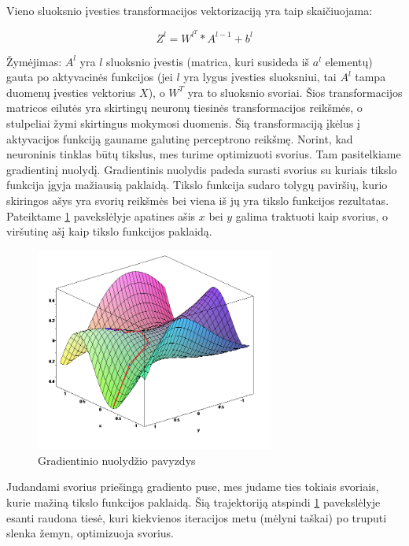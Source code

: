 \documentclass[a4paper, 12pt]{article}
\begin{document}
Vieno sluoksnio įvesties transformacijos vektorizaciją yra taip skaičiuojama:

$$
Z^{l}=W^{{l}^T} * A^{l-1}+b^{l}
$$

Žymėjimas: $A^l$ yra $l$ sluoksnio įvestis (matrica, kuri susideda iš $a^l$ elementų) gauta po aktyvacinės funkcijos (jei $l$ yra lygus įvesties sluoksniui, tai $A^l$ tampa duomenų įvesties vektorius $X$), o $W^T$ yra to sluoksnio svoriai.
Šios transformacijos matricos eilutės yra skirtingų neuronų tiesinės transformacijos reikšmės, o stulpeliai žymi skirtingus mokymosi duomenis. Šią transformaciją įkėlus į aktyvacijos funkciją gauname galutinę perceptrono reikšmę.
Norint, kad neuroninis tinklas būtų tikslus, mes turime optimizuoti svorius. Tam pasitelkiame gradientinį nuolydį. Gradientinis nuolydis padeda surasti svorius su kuriais tikslo funkcija įgyja mažiausią paklaidą. Tikslo funkcija sudaro tolygų paviršių, kurio skiringos ašys yra svorių reikšmės bei viena iš jų yra tikslo funkcijos rezultatas. Pateiktame \ref{gradientinis nuolydis} pavekslėlyje apatines ašis $x$ bei $y$ galima traktuoti kaip svorius, o viršutinę ašį kaip tikslo funkcijos paklaidą. 

\begin{figure}[h]
\centering
\includegraphics[width=0.7\textwidth]{gradientinis nuolydis}
\caption{Gradientinio nuolydžio pavyzdys}
\label{gradientinis nuolydis}
\end{figure}

Judandami svorius priešingą gradiento puse, mes judame ties tokiais svoriais, kurie mažiną tikslo funkcijos paklaidą. Šią trajektoriją atspindi 
\ref{gradientinis nuolydis} pavekslėlyje esanti raudona tiesė, kuri kiekvienos iteracijos metu (mėlyni taškai) po truputi slenka žemyn, optimizuoja svorius.
\end{document}
